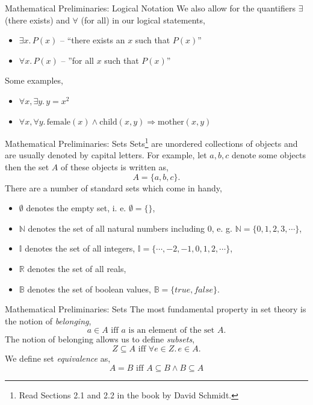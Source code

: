 \documentclass{beamer}
\begin{document}
\begin{frame}{\large Mathematical  Preliminaries: Logical Notation}
We also allow for the quantifiers $\exists$ (there exists) and $\forall$ (for all) in our logical
statements,
\begin{itemize}
\item $\exists x.\,P(x)$ -- ``there exists an $x$ such that $P(x)$''
\item $\forall x.\,P(x)$ -- ''for all $x$ such that $P(x)$''
\end{itemize}
Some examples,
\begin{itemize}
\item $\forall x,\exists y.\, y = x^2$
\item $\forall x, \forall y.\, \mbox{female}(x) \wedge \mbox{child}(x,y) \Rightarrow \mbox{mother}(x,y)$
\end{itemize}

\end{frame}


\begin{frame}{\large Mathematical  Preliminaries: Sets}
Sets\footnote{\tiny Read Sections 2.1 and 2.2 in the book by David Schmidt.}
 are unordered collections of objects and are usually denoted by capital letters.  For example,
let $a,b,c$ denote some objects then the set $A$ of these objects is written as,
\[
A = \{a,b,c\}.
\]
There are a number of standard sets which come in handy,
\begin{itemize}
\item $\emptyset$ denotes the empty set, i. e. $\emptyset = \{ \}$,
\item $\mathbb N$ denotes the set of all natural numbers including 0, e. g. ${\mathbb N} = \{0,1,2,3,\cdots\}$,
\item $\mathbb I$ denotes the set of all integers, ${\mathbb I}= \{\cdots,-2,-1,0,1,2,\cdots\}$,
\item $\mathbb R$ denotes the set of all reals,
\item $\mathbb B$ denotes the set of boolean values, ${\mathbb B} = \{\mathit{true}, \mathit{false} \}$.
\end{itemize}
\end{frame}

\begin{frame}{\large Mathematical  Preliminaries: Sets}
The most fundamental property in set theory is the notion of {\em belonging},
\[
a \in A \mbox{ iff  $a$ is an element of the set $A$}.
\]
The notion of belonging allows us
to define {\em subsets},
\[
Z \subseteq A \mbox{ iff } \forall e\in Z.\, e\in A.
\]
We define set {\em equivalence} as,
\[
A = B \mbox{ iff } A \subseteq B \wedge B \subseteq A
\]
\end{frame}
\end{document}

